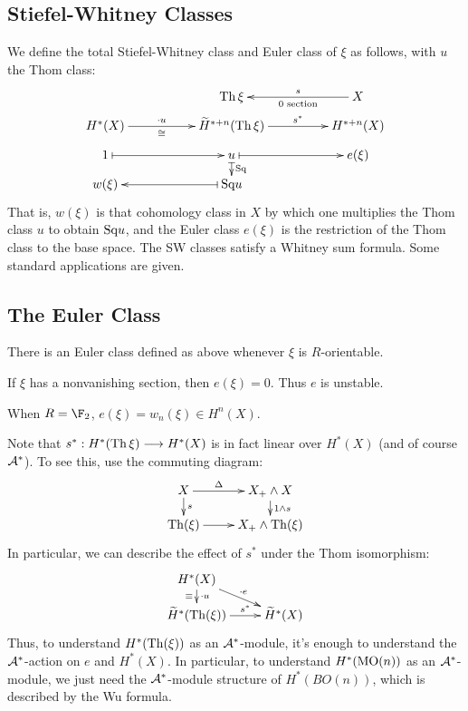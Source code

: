 \documentclass[11pt]{article}
\renewcommand{\Steen}{\calA}
\begin{document}
\subsection{Stiefel-Whitney Classes}
We define the total Stiefel-Whitney class and Euler class of $\xi$ as follows, with $u$ the Thom class:
%
%
\[\xymatrix@R=.805cm@C=3.5cm@!0{
&
\Thom\xi
&
X
\ar[l]^-{\textup{0 section}}_-s
\\
H^*(X)
\ar[r]^-{\cdot u}_-{\cong}
&%
\widetilde{H}^{*+n}(\Thom\xi)
\ar[r]^-{s^*}
&
{H}^{*+n}(X)
\\%
1
\ar@{|->}[r]
&%
u
\ar@{|->}[d]^-{\Squ}
\ar@{|->}[r]
&
e(\xi)
\\%
w(\xi)
&%
\Squ u\ar@{|->}[l]%
}\]
That is, $w(\xi)$ is that cohomology class in $X$ by which one multiplies the Thom class $u$ to obtain $\textup{Sq} u$, and the Euler class $e(\xi)$ is the restriction of the Thom class to the base space.
The SW classes satisfy a Whitney sum formula. Some standard applications are given.
\subsection{The Euler Class}
\begin{itemise}
\item There is an Euler class defined as above whenever $\xi$ is $R$-orientable.
\item If $\xi$ has a nonvanishing section, then $e(\xi)=0$. Thus $e$ is unstable.
\item When $R=\F_2$, $e(\xi)=w_n(\xi)\in H^n(X)$.
\end{itemise}
Note that $s^*:H^*(\operatorname{Th}\xi)\longrightarrow H^*(X)$ is in fact linear over $H^*(X)$ (and of course $\Steen^*$). To see this, use the commuting diagram:
\[\xymatrix@R=4mm{
X
\ar[r]^-{\Delta}
\ar[d]^-{s}
&%
X_+\wedge X
\ar[d]^-{1\wedge s}
\\%
\Thom(\xi)
\ar[r]
&%
X_+\wedge \Thom(\xi)%
}\]
In particular, we can describe the effect of $s^*$ under the Thom isomorphism:
\[\xymatrix@R=4mm{
H^*(X)
\ar[rd]^-{\cdot e}
\ar[d]^-{\cdot u}_-{\equiv}
&%
\\%
\widetilde{H}^{*}(\Thom(\xi))
\ar[r]^-{s^*}
&%
\widetilde{H}^{*}(X)%
}\]
Thus, to understand $H^*(\operatorname{Th}(\xi))$ as an $\Steen^*$-module, it's enough to understand the $\Steen^*$-action on $e$ and $H^*(X)$. 
In particular, to understand $H^*(\operatorname{{MO}}(n))$ as an $\Steen^*$-module, we just need the $\Steen^*$-module structure of $H^*(BO(n))$, which is described by the Wu formula.
\end{document}
